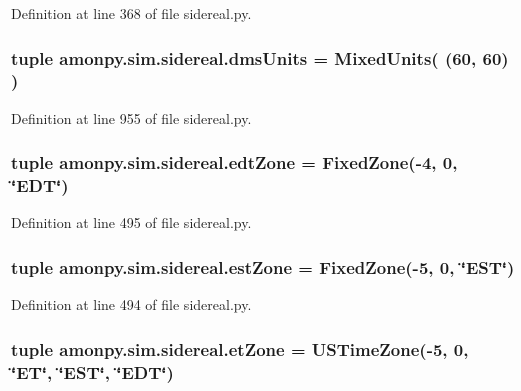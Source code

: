 Definition at line 368 of file sidereal.\-py.

\hypertarget{namespaceamonpy_1_1sim_1_1sidereal_a96f3c1e64339d84582035c717708e859}{
\subsubsection[{dms\-Units}]{\setlength{\rightskip}{0pt plus 5cm}tuple amonpy.\-sim.\-sidereal.\-dms\-Units = {\bf Mixed\-Units}( (60, 60) )}}\label{namespaceamonpy_1_1sim_1_1sidereal_a96f3c1e64339d84582035c717708e859}


Definition at line 955 of file sidereal.\-py.

\hypertarget{namespaceamonpy_1_1sim_1_1sidereal_a7dc76e45276335e04963acaa48314678}{
\subsubsection[{edt\-Zone}]{\setlength{\rightskip}{0pt plus 5cm}tuple amonpy.\-sim.\-sidereal.\-edt\-Zone = {\bf Fixed\-Zone}(-\/4, 0, \char`\"{}E\-D\-T\char`\"{})}}\label{namespaceamonpy_1_1sim_1_1sidereal_a7dc76e45276335e04963acaa48314678}


Definition at line 495 of file sidereal.\-py.

\hypertarget{namespaceamonpy_1_1sim_1_1sidereal_a24a02d8044a4126d459464bf644ea7cb}{
\subsubsection[{est\-Zone}]{\setlength{\rightskip}{0pt plus 5cm}tuple amonpy.\-sim.\-sidereal.\-est\-Zone = {\bf Fixed\-Zone}(-\/5, 0, \char`\"{}E\-S\-T\char`\"{})}}\label{namespaceamonpy_1_1sim_1_1sidereal_a24a02d8044a4126d459464bf644ea7cb}


Definition at line 494 of file sidereal.\-py.

\hypertarget{namespaceamonpy_1_1sim_1_1sidereal_a29ebdf7098f9eb57a1f5c78fada23824}{
\subsubsection[{et\-Zone}]{\setlength{\rightskip}{0pt plus 5cm}tuple amonpy.\-sim.\-sidereal.\-et\-Zone = {\bf U\-S\-Time\-Zone}(-\/5, 0, \char`\"{}E\-T\char`\"{}, \char`\"{}E\-S\-T\char`\"{}, \char`\"{}E\-D\-T\char`\"{})}}\label{namespaceamonpy_1_1sim_1_1sidereal_a29ebdf7098f9eb57a1f5c78fada23824}



